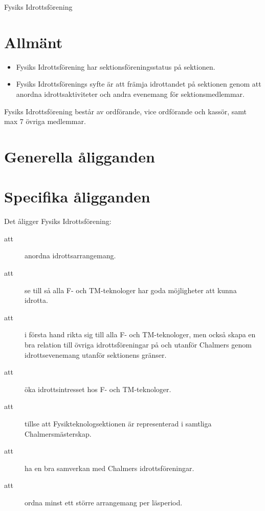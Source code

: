 \documentclass[a4paper]{article}
\begin{document}
\renewcommand{\forening}{Fysiks Idrottsförening} %

\begin{foreningenv}{\forening{}} %
    \section{Allmänt}
    \begin{itemize}
        \item Fysiks Idrottsförening har sektionsföreningsstatus på sektionen.
        \item Fysiks Idrottsförenings syfte är att främja idrottandet på sektionen genom att anordna idrottsaktiviteter och andra evenemang för sektionsmedlemmar.
    \end{itemize}
    
    Fysiks Idrottsförening består av ordförande, vice ordförande och kassör, samt max 7 övriga medlemmar.
    
    \section{Generella åligganden}
    \aliggsektfor{}
    
    \section{Specifika åligganden}
    Det åligger \forening{}:
    \begin{description}
        \item[att] anordna idrottsarrangemang.
        \item[att] se till så alla F- och TM-teknologer har goda möjligheter att kunna idrotta.
        \item[att] i första hand rikta sig till alla F- och TM-teknologer, men också skapa en bra relation till övriga idrottsföreningar på och utanför Chalmers genom idrottsevenemang utanför sektionens gränser.
        \item[att] öka idrottsintresset hos F- och TM-teknologer.
        \item[att] tillse att Fysikteknologsektionen är representerad i samtliga Chalmersmästerskap.
        \item[att] ha en bra samverkan med Chalmers idrottsföreningar. %
        \item[att] ordna minst ett större arrangemang per läsperiod.
    \end{description}
    

\end{foreningenv}
\end{document}
